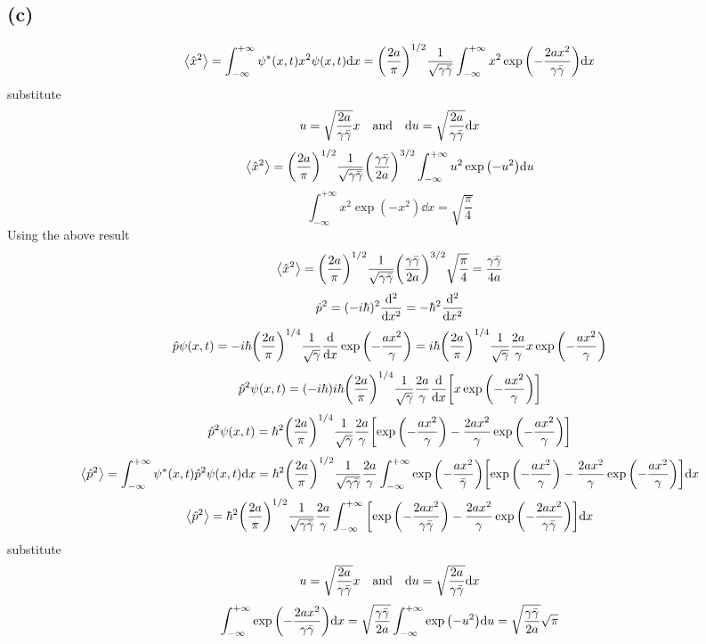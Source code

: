 \subsection*{(c)}
\[\expval{\hat{x}^2}=\int_{-\infty}^{+\infty}\psi^*(x,t)x^2\psi(x,t)\dd x=\qty(\frac{2a}{\pi})^{1/2}\frac{1}{\sqrt{\gamma\bar{\gamma}}}\int_{-\infty}^{+\infty}x^2\exp\qty(-\frac{2ax^2}{\gamma\bar{\gamma}})\dd x\]
substitute \[u=\sqrt{\frac{2a}{\gamma\bar{\gamma}}}x\qq{and}\dd u=\sqrt{\frac{2a}{\gamma\bar{\gamma}}}\dd x\]
\[\ev{\hat{x}^2}=\qty(\frac{2a}{\pi})^{1/2}\frac{1}{\sqrt{\gamma\bar{\gamma}}}\qty(\frac{\gamma\bar{\gamma}}{2a})^{3/2}\int_{-\infty}^{+\infty}u^2\exp\qty(-u^2)\dd u\]
\[\tag{1}\int_{-\infty}^{+\infty}x^2\exp(-x^2)\dd x=\sqrt{\frac{\pi}{4}}\]
Using the above result \[\ev{\hat{x}^2}=\qty(\frac{2a}{\pi})^{1/2}\frac{1}{\sqrt{\gamma\bar{\gamma}}}\qty(\frac{\gamma\bar{\gamma}}{2a})^{3/2}\sqrt{\frac{\pi}{4}}=\frac{\gamma\bar{\gamma}}{4a}\]
\[\hat{p}^2=(-i\hbar)^2\dv[2]{x}=-\hbar^2\dv[2]{x}\]
\[\hat{p}\psi(x,t)=-i\hbar\qty(\frac{2a}{\pi})^{1/4}\frac{1}{\sqrt{\gamma}}\dv{x}\exp\qty(-\frac{ax^2}{\gamma})=i\hbar\qty(\frac{2a}{\pi})^{1/4}\frac{1}{\sqrt{\gamma}}\frac{2a}{\gamma}	 x\exp\qty(-\frac{ax^2}{\gamma})\]
\[\hat{p}^2\psi(x,t)=(-i\hbar)i\hbar\qty(\frac{2a}{\pi})^{1/4}\frac{1}{\sqrt{\gamma}}\frac{2a}{\gamma}\dv{x} \qty[x\exp\qty(-\frac{ax^2}{\gamma})]\]
\[\hat{p}^2\psi(x,t)=\hbar^2\qty(\frac{2a}{\pi})^{1/4}\frac{1}{\sqrt{\gamma}}\frac{2a}{\gamma} \qty[\exp\qty(-\frac{ax^2}{\gamma})-\frac{2ax^2}{\gamma}\exp\qty(-\frac{ax^2}{\gamma})]\]
\[\ev{\hat{p}^2}=\int_{-\infty}^{+\infty}\psi^*(x,t)\hat{p}^2\psi(x,t)\dd x=\hbar^2\qty(\frac{2a}{\pi})^{1/2}\frac{1}{\sqrt{\gamma\bar{\gamma}}}\frac{2a}{\gamma}\int_{-\infty}^{+\infty}\exp\qty(-\frac{ax^2}{\bar{\gamma}}) \qty[\exp\qty(-\frac{ax^2}{\gamma})-\frac{2ax^2}{\gamma}\exp\qty(-\frac{ax^2}{\gamma})]\dd x\]
\[\ev{\hat{p}^2}=\hbar^2\qty(\frac{2a}{\pi})^{1/2}\frac{1}{\sqrt{\gamma\bar{\gamma}}}\frac{2a}{\gamma}\int_{-\infty}^{+\infty} \qty[\exp\qty(-\frac{2ax^2}{\gamma\bar{\gamma}})-\frac{2ax^2}{\gamma}\exp\qty(-\frac{2ax^2}{\gamma\bar{\gamma}})]\dd x\]
substitute \[u=\sqrt{\frac{2a}{\gamma\bar{\gamma}}}x\qq{and}\dd u=\sqrt{\frac{2a}{\gamma\bar{\gamma}}}\dd x\]
\[\int_{-\infty}^{+\infty}\exp\qty(-\frac{2ax^2}{\gamma\bar{\gamma}})\dd x=\sqrt{\frac{\gamma\bar{\gamma}}{2a}}\int_{-\infty}^{+\infty}\exp\qty(-u^2)\dd u=\sqrt{\frac{\gamma\bar{\gamma}}{2a}}\sqrt{\pi}\]

